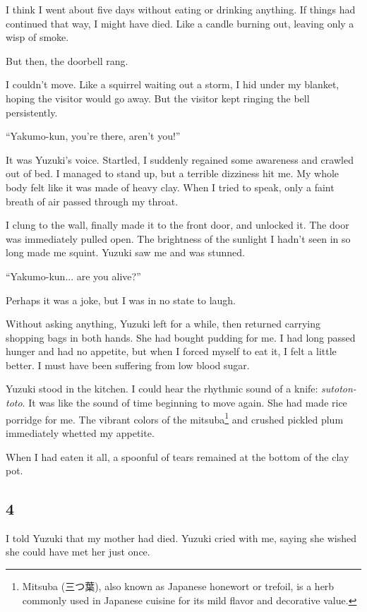 \documentclass[
    a4paper,
    12pt,
    twoside,
    openany,
    UTF8,
    fontset=windows
]{ctexbook}
\begin{document}
I think I went about five days without eating or drinking anything. If things had continued that way, I might have died. Like a candle burning out, leaving only a wisp of smoke.

But then, the doorbell rang.

I couldn't move. Like a squirrel waiting out a storm, I hid under my blanket, hoping the visitor would go away. But the visitor kept ringing the bell persistently.

``Yakumo-kun, you're there, aren't you!''

It was Yuzuki's voice. Startled, I suddenly regained some awareness and crawled out of bed. I managed to stand up, but a terrible dizziness hit me. My whole body felt like it was made of heavy clay. When I tried to speak, only a faint breath of air passed through my throat.

I clung to the wall, finally made it to the front door, and unlocked it. The door was immediately pulled open. The brightness of the sunlight I hadn't seen in so long made me squint. Yuzuki saw me and was stunned.

``Yakumo-kun... are you alive?''

Perhaps it was a joke, but I was in no state to laugh.

Without asking anything, Yuzuki left for a while, then returned carrying shopping bags in both hands. She had bought pudding for me. I had long passed hunger and had no appetite, but when I forced myself to eat it, I felt a little better. I must have been suffering from low blood sugar.

Yuzuki stood in the kitchen. I could hear the rhythmic sound of a knife: \textit{sutoton-toto}. It was like the sound of time beginning to move again. She had made rice porridge for me. The vibrant colors of the mitsuba\footnote{Mitsuba (三つ葉), also known as Japanese honewort or trefoil, is a herb commonly used in Japanese cuisine for its mild flavor and decorative value.} and crushed pickled plum immediately whetted my appetite.

When I had eaten it all, a spoonful of tears remained at the bottom of the clay pot.


\subsection*{4}

I told Yuzuki that my mother had died. Yuzuki cried with me, saying she wished she could have met her just once.
\end{document}
